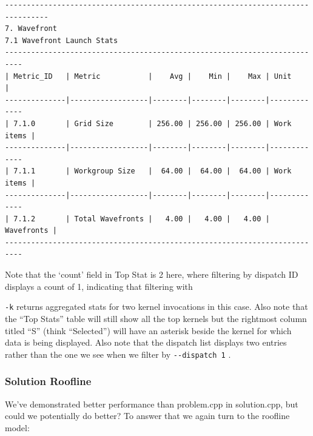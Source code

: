 \documentclass[
]{article}
\let\oldtexttt\texttt
\renewcommand{\texttt}[1]{
  \colorbox{Light}{\oldtexttt{#1}}
}
\begin{document}
\begin{Verbatim}[fontsize=\footnotesize]
                                                                                                                                                                                                                --------------------------------------------------------------------------------
7. Wavefront
7.1 Wavefront Launch Stats
--------------------------------------------------------------------------
| Metric_ID   | Metric           |    Avg |    Min |    Max | Unit       |
--------------|------------------|--------|--------|--------|-------------
| 7.1.0       | Grid Size        | 256.00 | 256.00 | 256.00 | Work items |
--------------|------------------|--------|--------|--------|-------------
| 7.1.1       | Workgroup Size   |  64.00 |  64.00 |  64.00 | Work items |
--------------|------------------|--------|--------|--------|-------------
| 7.1.2       | Total Wavefronts |   4.00 |   4.00 |   4.00 | Wavefronts |
--------------------------------------------------------------------------
\end{Verbatim}

Note that the `count' field in Top Stat is 2 here, where filtering by
dispatch ID displays a count of 1, indicating that filtering with
\texttt{-k} returns aggregated stats for two kernel invocations in this
case. Also note that the ``Top Stats'' table will still show all the top
kernels but the rightmost column titled ``S'' (think ``Selected'') will
have an asterisk beside the kernel for which data is being displayed.
Also note that the dispatch list displays two entries rather than the
one we see when we filter by \texttt{-\/-dispatch\ 1}.

\hypertarget{solution-roofline}{%
\subsubsection{Solution Roofline}\label{solution-roofline}}

We've demonstrated better performance than problem.cpp in solution.cpp,
but could we potentially do better? To answer that we again turn to the
roofline model:
\end{document}
